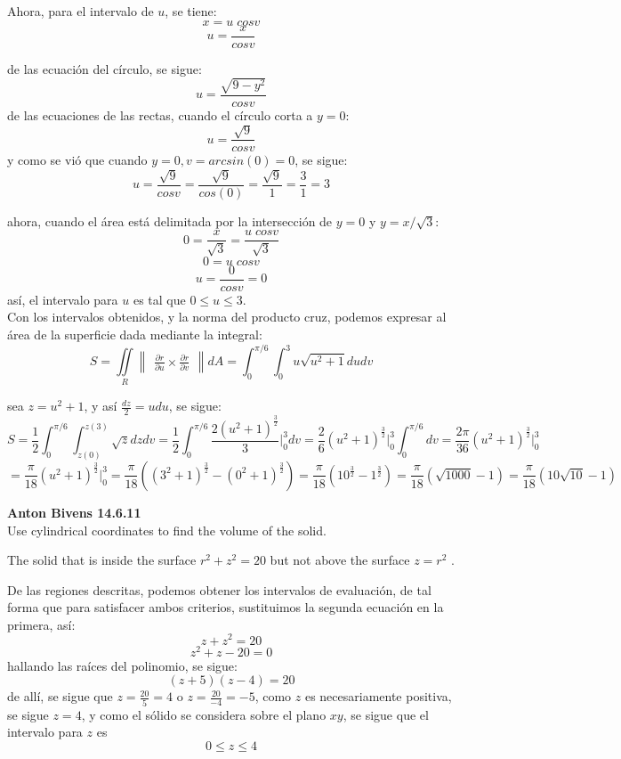 \documentclass{minimal}
\begin{document}
    Ahora, para el intervalo de $u$, se tiene:
        $$ x = u \; cos v $$
        $$ u = \frac{x}{cosv} $$

    de las ecuación del círculo, se sigue:
        $$ u = \frac{\sqrt{9 - y^2}}{cosv} $$
    de las ecuaciones de las rectas, cuando el círculo corta a $y = 0$:
        $$ u = \frac{\sqrt{9}}{cosv} $$
    y como se vió que cuando $y = 0, v = arcsin(0) = 0$, se sigue:
        $$ u = \frac{\sqrt{9}}{cosv} = \frac{\sqrt{9}}{cos(0)}
             = \frac{\sqrt{9}}{1} = \frac{3}{1} = 3 $$

    ahora, cuando el área está delimitada por la intersección de $ y = 0$ y
    $ y = x / \sqrt 3  $:
        $$ 0 = \frac{x}{\sqrt 3} = \frac{u \; cos v}{\sqrt 3} $$
        $$ 0 = u \; cos v $$
        $$ u = \frac{0}{cosv} = 0$$
    así, el intervalo para $u$ es tal que $ 0 \leq u \leq 3$.\\

    Con los intervalos obtenidos, y la norma del producto cruz, podemos expresar
    al área de la superficie dada mediante la integral:
        $$ S = \iint\limits_{R} \begin{Vmatrix} \frac{\partial r}{\partial u}
              \times \frac{\partial r}{\partial v}\end{Vmatrix} dA
             = \int_{0}^{\pi / 6}\int_{0}^{3}  u \sqrt{u^2 + 1} du dv  $$

    sea $z = u^2 + 1 $, y así $ \frac{dz}{2} = u du $, se sigue:
        $$ S = \frac{1}{2}\int_{0}^{\pi / 6}\int_{z(0)}^{z(3)} \sqrt{z} dzdv
             = \frac{1}{2}\int_{0}^{\pi / 6}
               \frac{2(u^2 + 1)^{\frac{3}{2}}}{3} \Big|_0^3 dv
             = \frac{2}{6} (u^2 + 1)^{\frac{3}{2}} \Big|_0^3
               \int_{0}^{\pi / 6} dv
             = \frac{2 \pi}{36} (u^2 + 1)^{\frac{3}{2}} \Big|_0^3 $$
        $$   = \frac{\pi}{18} (u^2 + 1)^{\frac{3}{2}} \Big|_0^3
             = \frac{\pi}{18} ((3^2 + 1)^\frac{3}{2} - (0^2 + 1)^\frac{3}{2})
             = \frac{\pi}{18} ( 10^\frac{3}{2} - 1^\frac{3}{2})
             = \frac{\pi}{18} ( \sqrt{1000} - 1 )
             = \frac{\pi}{18} ( 10 \sqrt{10} - 1 ) $$


\textbf{Anton Bivens 14.6.11}\\

Use cylindrical coordinates to find the volume of the solid.

The solid that is inside the surface $r^2 + z^2 = 20$ but not
above the surface $z = r^2$ .

De las regiones descritas, podemos obtener los intervalos de
evaluación, de tal forma que para satisfacer ambos criterios, sustituimos la
segunda ecuación en la primera, así:
    $$ z + z^2 = 20 $$
    $$ z^2 + z -20 = 0 $$
hallando las raíces del polinomio, se sigue:
    $$ (z + 5)(z - 4) = 20 $$
de allí, se sigue que $z = \frac{20}{5} = 4$ o $ z = \frac{20}{-4} = -5 $, como
$z$ es necesariamente positiva, se sigue $z = 4$, y como el sólido se considera
sobre el plano $xy$, se sigue que el intervalo para $z$ es
    $$ 0 \leq z \leq 4 $$
\end{document}
